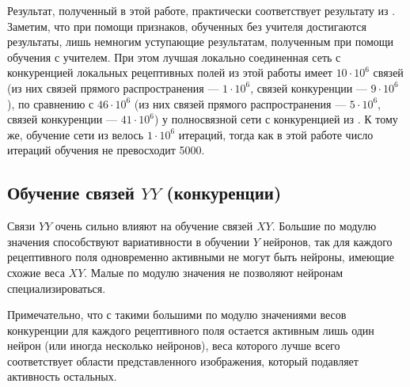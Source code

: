 \documentclass[a4paper]{article}
\begin{document}
Результат, полученный в этой работе, практически соответствует результату из \cite{saunders2019locally}. Заметим, что при помощи признаков, обученных без учителя достигаются результаты, лишь немногим уступающие результатам, полученным при помощи обучения с учителем. При этом лучшая локально соединенная сеть с конкуренцией локальных рецептивных полей из этой работы имеет $10 \cdot 10^6$ связей (из них связей прямого распространения --- $1 \cdot 10^6$, связей конкуренции --- $9 \cdot 10^6$), по сравнению с $46 \cdot 10^6$ (из них связей прямого распространения --- $5 \cdot 10^6$, связей конкуренции --- $41 \cdot 10^6$) у полносвязной сети с конкуренцией из \cite{mnist2}. К тому же, обучение сети из \cite{mnist2} велось $1 \cdot 10^6$ итераций, тогда как в этой работе число итераций обучения не превосходит 5000.

\subsection{Обучение связей $YY$ (конкуренции)}
Связи $YY$ очень сильно влияют на обучение связей $XY$. Большие по модулю значения способствуют вариативности в обучении $Y$ нейронов, так для каждого рецептивного поля одновременно активными не могут быть нейроны, имеющие схожие веса $XY$. Малые по модулю значения не позволяют нейронам специализироваться. 

Примечательно, что с такими большими по модулю значениями весов конкуренции для каждого рецептивного поля остается активным лишь один нейрон (или иногда несколько нейронов), веса которого лучше всего соответствует области представленного изображения, который подавляет активность остальных.
\end{document}
